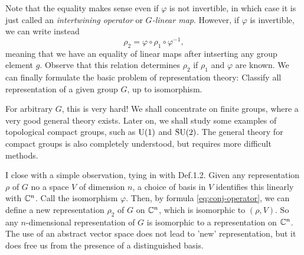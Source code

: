 Note that the equality makes sense even if \(\varphi\) is not invertible,
in which case it is just called an \emph{intertwining operator} or
\emph{\(G\)-linear map}. However, if \(\varphi\) is invertible, we can
write instead
\begin{equation}
  \label{eq:conj-operator}
  \rho_2=\varphi\circ\rho_1\circ\varphi^{-1},
\end{equation}
meaning that we have an equality of linear maps after intserting any group
element \(g\). Observe that this relation determines \(\rho_2\) if
\(\rho_1\) and \(\varphi\) are known. We can finally formulate the basic
problem of representation theory: Classify all representation of a given
group \(G\), up to isomorphism.

For arbitrary \(G\), this is very hard! We shall concentrate on finite
groups, where a very good general theory exists. Later on, we shall study
some examples of topological compact groups, such as \(\operatorname{U}(1)\) and
\(\operatorname{SU}(2)\). The general theory for compact groups is also completely
understood, but requires more difficult methods.

I close with a simple observation, tying in with Def.\@ 1.2. Given any
representation \(\rho\) of \(G\) no a space \(V\) of dimension \(n\), a
choice of basis in \(V\) identifies this linearly with \(\mathbb{C}^n\). Call the
isomorphism \(\varphi\). Then, by formula \eqref{eq:conj-operator}, we can
define a new representation \(\rho_2\) of \(G\) on \(\mathbb{C}^n\), which is
isomorphic to \((\rho,V)\). So any \(n\)-dimensional representation of
\(G\) is isomorphic to a representation on \(\mathbb{C}^n\). The use of an
abstract vector space does not lead to 'new' representation, but it does
free us from the presence of a distinguished basis.

